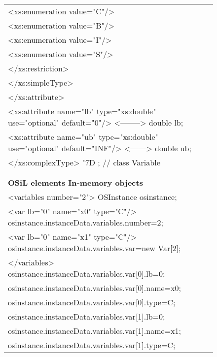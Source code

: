 \documentclass[11pt]{article}
\makeatletter
\renewcommand{\_}{{\char"5F}}
\renewcommand{\{}{{\char"7B}}
\renewcommand{\}}{{\char"7D}}
\renewcommand{\^}{{\char"0D}}
\renewcommand{\'}{{\char"0D}}
\def\preveqno{}\let\real@float=\@float \let\realend@float=\end@float
\def\@float{\let\@savefreelist\@freelist\real@float}
\def\end@float{\realend@float\global\let\@freelist\@savefreelist}
\def\lthtmltypeout#1{{\let\protect\string \immediate\write\lthtmlwrite{#1}}}%
\newcommand\lthtmlboxmathZ{\@next\next\@currlist{}{\def\next{\voidb@x}}%
 \expandafter\box\next\egroup}%
\newcommand\lthtmllogmath{\lthtmltypeout{l2hSize %
:\lthtmlmathenv:\the\ht\sizebox::\the\dp\sizebox::\the\wd\sizebox.\preveqno}}%
\newcommand\lthtmlfigureZ{\lthtmlboxmathZ\lthtmllogmath\copy\sizebox
       \global\let\@freelist\@savefreelist}%
\def\lthtmlcheckvsize{\ifdim\ht\sizebox<\vsize 
  \ifdim\wd\sizebox<\hsize\expandafter\hfill\fi \expandafter\vfill
  \else\expandafter\vss\fi}%
\makeatother
\begin{document}
{\begin{figure}
{{\begin{tabular}{@{}l@{}}
        <xs:enumeration value="C"/>\\[0pt]
        <xs:enumeration value="B"/>\\[0pt]
        <xs:enumeration value="I"/>\\[0pt]
        <xs:enumeration value="S"/>\\[0pt]
      </xs:restriction>\\[0pt]
    </xs:simpleType>\\[0pt]
  </xs:attribute>\\[0pt]
  <xs:attribute name="lb" type="xs:double" use="optional" default="0"/>  <-------->    double lb;\\[0pt]
  <xs:attribute name="ub" type="xs:double" use="optional" default="INF"/>  <------>    double ub;\\[0pt]
</xs:complexType>                                                                    \} ; // class Variable\\[0pt]
 \\[0pt]
 \\[0pt]
\textsf{\textbf{OSiL elements          \hspace{2.07in}  In-memory objects}}\\[8pt]
<variables number="2">                                  OSInstance osinstance;\\[0pt]
   <var lb="0" name="x0" type="C"/>                     osinstance.instanceData.variables.number=2;\\[0pt]
   <var lb="0" name="x1" type="C"/>                     osinstance.instanceData.variables.var=new Var[2];\\[0pt]
</variables>                                            osinstance.instanceData.variables.var[0].lb=0;\\[0pt]
                                                        osinstance.instanceData.variables.var[0].name=x0;\\[0pt]
                                                        osinstance.instanceData.variables.var[0].type=C;\\[0pt]
                                                        osinstance.instanceData.variables.var[1].lb=0;\\[0pt]
                                                        osinstance.instanceData.variables.var[1].name=x1;\\[0pt]
                                                        osinstance.instanceData.variables.var[1].type=C;
\end{tabular} }} \medskip\\[0pt]
\end{figure}%
\lthtmlfigureZ
\lthtmlcheckvsize\clearpage}
\end{document}
